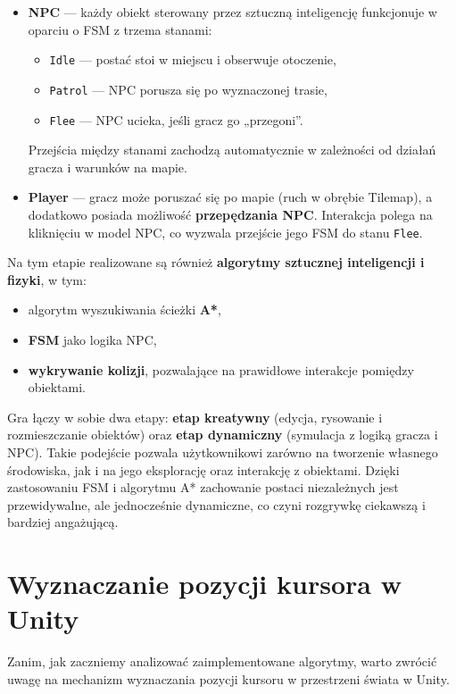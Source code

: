 \documentclass[a4paper,12pt]{book} %
\begin{document}
\begin{itemize}
    \item \textbf{NPC} — każdy obiekt sterowany przez sztuczną inteligencję funkcjonuje w oparciu o FSM z trzema stanami:
    \begin{itemize}
        \item \texttt{Idle} --- postać stoi w miejscu i obserwuje otoczenie,  
        \item \texttt{Patrol} --- NPC porusza się po wyznaczonej trasie,  
        \item \texttt{Flee} --- NPC ucieka, jeśli gracz go „przegoni”.  
    \end{itemize}
    Przejścia między stanami zachodzą automatycznie w zależności od działań gracza i warunków na mapie.
    
    \item \textbf{Player} — gracz może poruszać się po mapie (ruch w obrębie Tilemap), 
    a dodatkowo posiada możliwość \textbf{przepędzania NPC}. 
    Interakcja polega na kliknięciu w model NPC, co wyzwala przejście jego FSM do stanu \texttt{Flee}.
\end{itemize}



Na tym etapie realizowane są również \textbf{algorytmy sztucznej inteligencji i fizyki}, w tym:
\begin{itemize}
    \item algorytm wyszukiwania ścieżki \textbf{A*},  
    \item \textbf{FSM} jako logika NPC,  
    \item \textbf{wykrywanie kolizji}, pozwalające na prawidłowe interakcje pomiędzy obiektami.  
\end{itemize}

Gra łączy w sobie dwa etapy: \textbf{etap kreatywny} (edycja, rysowanie i rozmieszczanie obiektów) 
oraz \textbf{etap dynamiczny} (symulacja z logiką gracza i NPC). 
Takie podejście pozwala użytkownikowi zarówno na tworzenie własnego środowiska, 
jak i na jego eksplorację oraz interakcję z obiektami. 
Dzięki zastosowaniu FSM i algorytmu A* zachowanie postaci niezależnych jest przewidywalne, ale jednocześnie dynamiczne, 
co czyni rozgrywkę ciekawszą i bardziej angażującą.

\section{Wyznaczanie pozycji kursora w Unity}

Zanim, jak zaczniemy analizować zaimplementowane algorytmy, warto zwrócić uwagę na mechanizm wyznaczania pozycji kursoru w przestrzeni świata w Unity.
\end{document}
